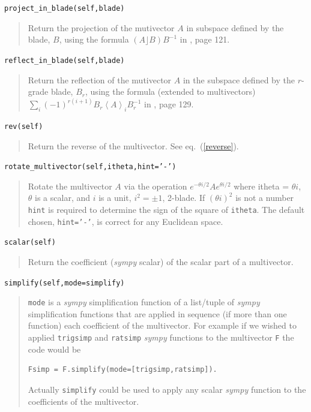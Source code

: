 \documentclass[12pt]{report}
\newcommand{\lp}{\left (}
\newcommand{\rp}{\right )}
\newcommand{\grade}[1]{\left < {#1} \right >}
\newcommand{\paren}[1]{\lp {#1} \rp}
\newcommand{\T}[1]{\texttt{#1}}
\begin{document}
\T{project\_in\_blade(self,blade)}
\begin{quote}
    Return the projection of the mutivector $A$ in subspace defined by the blade, $B$, using the formula
    $\paren{A\rfloor B}B^{-1} $ in \cite{Macdonald 1}, page 121.
\end{quote}

\T{reflect\_in\_blade(self,blade)}
\begin{quote}
    Return the reflection of the mutivector $A$ in the subspace defined by the $r$-grade blade, $B_{r}$, using the formula
    (extended to multivectors) $\sum_{i} \paren{-1}^{r\paren{i+1}}{B}_{r}\grade{A}_{i}B_{r}^{-1}$ in
    \cite{Macdonald 1}, page 129.
\end{quote}

\T{rev(self)}
\begin{quote}
   Return the reverse of the multivector.  See eq.~(\ref{reverse}).
\end{quote}

\T{rotate\_multivector(self,itheta,hint='-')}
\begin{quote}
    Rotate the multivector $A$ via the operation $e^{-\theta i/2}Ae^{\theta i/2}$
    where itheta = $\theta i$, $\theta$ is a scalar, and $i$ is a unit, $i^{2} = \pm 1$, 2-blade.
    If $\paren{\theta i}^{2}$ is not a number \T{hint} is required to determine the sign of the
    square of \T{itheta}.  The default chosen, \T{hint='-'}, is correct for any Euclidean space.
\end{quote}

\T{scalar(self)}
\begin{quote}
    Return the coefficient (\emph{sympy} scalar) of the scalar part of a
    multivector.
\end{quote}

\T{simplify(self,mode=simplify)}
\begin{quote}
   \T{mode} is a \emph{sympy} simplification function of a list/tuple of \emph{sympy}
   simplification functions that are applied in sequence (if more than
   one function) each coefficient of the multivector.  For example if
   we wished to applied \T{trigsimp} and \T{ratsimp} \emph{sympy} functions to the
   multivector \T{F} the code would be
   \begin{lstlisting}[numbers=none]
   Fsimp = F.simplify(mode=[trigsimp,ratsimp]).
   \end{lstlisting}
   \vspace{-10pt}
   Actually \T{simplify} could be used to apply any scalar \emph{sympy} function to
   the coefficients of the multivector.
\end{quote}
\end{document}
